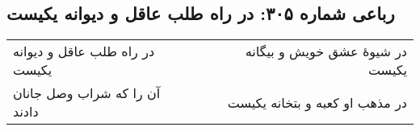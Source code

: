 \begin{center}
\section*{رباعی شماره ۳۰۵: در راه طلب عاقل و دیوانه یکیست}
\label{sec:0305}
\begin{longtable}{l p{0.5cm} r}
در راه طلب عاقل و دیوانه یکیست
&&
در شیوهٔ عشق خویش و بیگانه یکیست
\\
آن را که شراب وصل جانان دادند
&&
در مذهب او کعبه و بتخانه یکیست
\\
\end{longtable}
\end{center}
